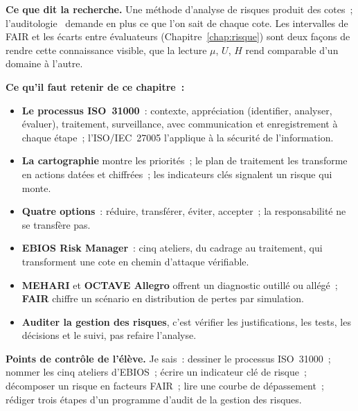 \begin{boxinfo}
\textbf{Ce que dit la recherche.} Une méthode d'analyse de risques produit
des cotes~; l'auditologie~\cite{minka2026auditologie} demande en plus ce que
l'on sait de chaque cote. Les intervalles de FAIR et les écarts entre
évaluateurs (Chapitre~\ref{chap:risque}) sont deux façons de rendre cette
connaissance visible, que la lecture $\mu$, $U$, $H$ rend comparable d'un
domaine à l'autre.
\end{boxinfo}

\separateur

\begin{boxresume}
\textbf{Ce qu'il faut retenir de ce chapitre~:}
\begin{itemize}
    \item \textbf{Le processus ISO~31000}~: contexte, appréciation
          (identifier, analyser, évaluer), traitement, surveillance, avec
          communication et enregistrement à chaque étape~; l'ISO/IEC~27005
          l'applique à la sécurité de l'information.
    \item \textbf{La cartographie} montre les priorités~; le plan de
          traitement les transforme en actions datées et chiffrées~; les
          indicateurs clés signalent un risque qui monte.
    \item \textbf{Quatre options}~: réduire, transférer, éviter, accepter~;
          la responsabilité ne se transfère pas.
    \item \textbf{EBIOS Risk Manager}~: cinq ateliers, du cadrage au
          traitement, qui transforment une cote en chemin d'attaque
          vérifiable.
    \item \textbf{MEHARI} et \textbf{OCTAVE Allegro} offrent un diagnostic
          outillé ou allégé~; \textbf{FAIR} chiffre un scénario en
          distribution de pertes par simulation.
    \item \textbf{Auditer la gestion des risques}, c'est vérifier les
          justifications, les tests, les décisions et le suivi, pas refaire
          l'analyse.
\end{itemize}
\end{boxresume}

\begin{boxinfo}
\textbf{Points de contrôle de l'élève.} Je sais~: dessiner le processus
ISO~31000~; nommer les cinq ateliers d'EBIOS~; écrire un indicateur clé de
risque~; décomposer un risque en facteurs FAIR~; lire une courbe de
dépassement~; rédiger trois étapes d'un programme d'audit de la gestion des
risques.
\end{boxinfo}

